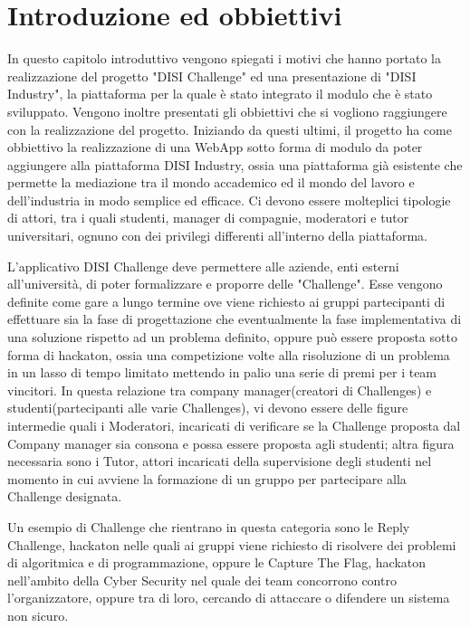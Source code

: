 \chapter{Introduzione ed obbiettivi }
\label{cha:intro}
In questo capitolo introduttivo vengono spiegati i motivi che hanno portato la realizzazione del progetto "DISI Challenge" ed una presentazione di "DISI Industry", la piattaforma per la quale è stato integrato il modulo che è stato sviluppato. Vengono inoltre presentati gli obbiettivi che si vogliono raggiungere con la realizzazione del progetto.
Iniziando da questi ultimi, il progetto ha come obbiettivo la realizzazione di una WebApp sotto forma di modulo da poter aggiungere alla piattaforma DISI Industry, ossia una piattaforma già esistente che permette la mediazione tra il mondo accademico ed il mondo del lavoro e dell'industria in modo semplice ed efficace. Ci devono essere molteplici tipologie di attori, tra i quali studenti, manager di compagnie, moderatori e tutor universitari, ognuno con dei privilegi differenti all'interno della piattaforma. 


L'applicativo DISI Challenge deve permettere alle aziende, enti esterni all'università, di poter formalizzare e proporre delle "Challenge". Esse vengono definite come gare a lungo termine ove viene richiesto ai gruppi partecipanti di effettuare sia la fase di progettazione che eventualmente la fase implementativa di una soluzione rispetto ad un problema definito, oppure può essere proposta sotto forma di hackaton, ossia una competizione volte alla risoluzione di un problema in un lasso di tempo limitato mettendo in palio una serie di premi per i team vincitori. In questa relazione tra company manager(creatori di Challenges) e studenti(partecipanti alle varie Challenges), vi devono essere delle figure intermedie quali i Moderatori, incaricati di verificare se la Challenge proposta dal Company manager sia consona e possa essere proposta agli studenti; altra figura necessaria sono i Tutor, attori incaricati della supervisione degli studenti nel momento in cui avviene la formazione di un gruppo per partecipare alla Challenge designata.

Un esempio di Challenge che rientrano in questa categoria sono le Reply Challenge, hackaton nelle quali ai gruppi viene richiesto di risolvere dei problemi di algoritmica e di programmazione, oppure le Capture The Flag, hackaton nell'ambito della Cyber Security nel quale dei team concorrono contro l'organizzatore, oppure tra di loro, cercando di attaccare o difendere un sistema non sicuro.

